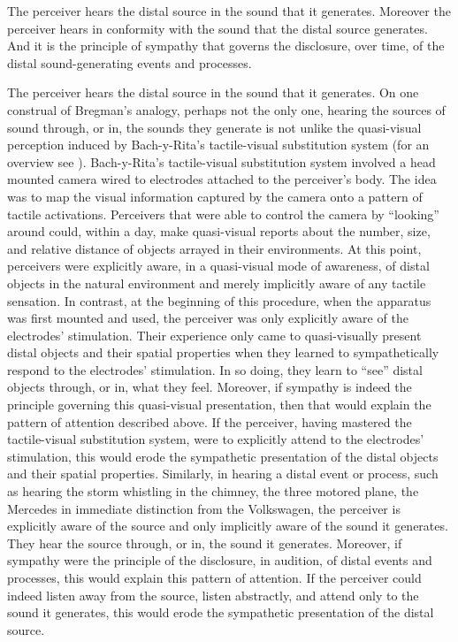 The perceiver hears the distal source in the sound that it generates. Moreover the perceiver hears in conformity with the sound that the distal source generates. And it is the principle of sympathy that governs the disclosure, over time, of the distal sound-generating events and processes.

The perceiver hears the distal source in the sound that it generates. On one construal of Bregman's analogy, perhaps not the only one, hearing the sources of sound through, or in, the sounds they generate is not unlike the quasi-visual perception induced by Bach-y-Rita's tactile-visual substitution system (for an overview see \citealt{Bach-y-Rita:2002jk}). Bach-y-Rita's tactile-visual substitution system involved a head mounted camera wired to electrodes attached to the perceiver's body. The idea was to map the visual information captured by the camera onto a pattern of tactile activations. Perceivers that were able to control the camera by ``looking'' around could, within a day, make quasi-visual reports about the number, size, and relative distance of objects arrayed in their environments. At this point, perceivers were explicitly aware, in a quasi-visual mode of awareness, of distal objects in the natural environment and merely implicitly aware of any tactile sensation. In contrast, at the beginning of this procedure, when the apparatus was first mounted and used, the perceiver was only explicitly aware of the electrodes' stimulation. Their experience only came to quasi-visually present distal objects and their spatial properties when they learned to sympathetically respond to the electrodes' stimulation. In so doing, they learn to ``see'' distal objects through, or in, what they feel. Moreover, if sympathy is indeed the principle governing this quasi-visual presentation, then that would explain the pattern of attention described above. If the perceiver, having mastered the tactile-visual substitution system, were to explicitly attend to the electrodes' stimulation, this would erode the sympathetic presentation of the distal objects and their spatial properties. Similarly, in hearing a distal event or process, such as hearing the storm whistling in the chimney, the three motored plane, the Mercedes in immediate distinction from the Volkswagen, the perceiver is explicitly aware of the source and only implicitly aware of the sound it generates. They hear the source through, or in, the sound it generates. Moreover, if sympathy were the principle of the disclosure, in audition, of distal events and processes, this would explain this pattern of attention. If the perceiver could indeed listen away from the source, listen abstractly, and attend only to the sound it generates, this would erode the sympathetic presentation of the distal source. 

